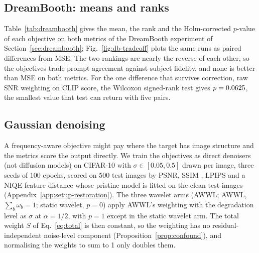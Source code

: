 
\subsection{DreamBooth: means and ranks}
\label{app:supp-dreambooth}

Table~\ref{tab:dreambooth} gives the mean, the rank and the Holm-corrected
$p$-value of each objective on both metrics of the DreamBooth experiment of
Section~\ref{sec:dreambooth}; Fig.~\ref{fig:db-tradeoff} plots the same runs
as paired differences from MSE. The two rankings are nearly the reverse of
each other, so the objectives trade prompt agreement against subject
fidelity, and none is better than MSE on both metrics. For the one difference
that survives correction, raw SNR weighting on CLIP score, the Wilcoxon
signed-rank test gives $p = 0.0625$, the smallest value that
test can return with five pairs.


\subsection{Gaussian denoising}
\label{sec:restoration}

A frequency-aware objective might pay where the target has image structure and
the metrics score the output directly. We train the objectives as direct
denoisers (not diffusion models) on CIFAR-10 with $\sigma \in [0.05, 0.5]$
drawn per image, three seeds of 100 epochs, scored on 500 test images by
PSNR, SSIM \citep{wang2004image}, LPIPS \citep{zhang2018unreasonable} and a
NIQE-feature distance \citep{mittal2013making} whose pristine model is fitted
on the clean test images (Appendix~\ref{app:setup-restoration}). The three wavelet
arms (AWWL; AWWL, $\sum_b \omega_b = 1$; static wavelet, $p = 0$) apply AWWL's
weighting with the degradation level as $\sigma$ at $\alpha = 1/2$, with
$p = 1$ except in the static wavelet arm. The total weight $S$
of Eq.~\eqref{eq:total} is then constant, so the weighting has no
residual-independent noise-level component (Proposition~\ref{prop:confound}),
and normalising the weights to sum to 1 only doubles them.

